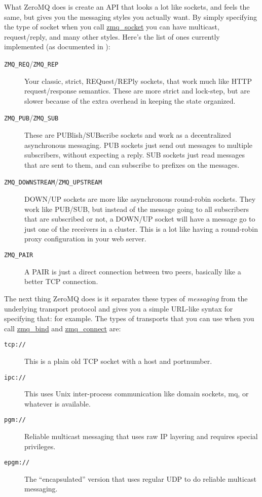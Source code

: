 What ZeroMQ does is create an API that looks a lot like sockets, and feels the
same, but gives you the messaging styles you actually want.  By simply
specifying the type of socket when you call
\href{http://api.zeromq.org/zmq\_socket.html}{zmq\_socket} you can have
multicast, request/reply, and many other styles.  Here's the list of ones
currently implemented (as documented in ):

\begin{description}
  \item [\texttt{ZMQ\_REQ}/\texttt{ZMQ\_REP}]  Your classic, strict, REQuest/REPly sockets, that work much like
    HTTP request/response semantics.  These are more strict and lock-step, but are slower
    because of the extra overhead in keeping the state organized.
  \item [\texttt{ZMQ\_PUB}/\texttt{ZMQ\_SUB}]  These are PUBlish/SUBscribe sockets and work as a decentralized
    asynchronous messaging.  PUB sockets just send out messages to multiple subscribers, without
    expecting a reply.  SUB sockets just read messages that are sent to them, and can subscribe
    to prefixes on the messages.
  \item [\texttt{ZMQ\_DOWNSTREAM}/\texttt{ZMQ\_UPSTREAM}] DOWN/UP sockets are more like asynchronous round-robin
    sockets.  They work like PUB/SUB, but instead of the message going to all subscribers that
    are subscribed or not, a DOWN/UP socket will have a message go to just one of the receivers
    in a cluster.  This is a lot like having a round-robin proxy configuration in your web server.
  \item [\texttt{ZMQ\_PAIR}] A PAIR is just a direct connection between two peers, basically like a better
    TCP connection.
\end{description}

The next thing ZeroMQ does is it separates these types of \emph{messaging} from the underlying
transport protocol and gives you a simple URL-like syntax for specifying that: 
for example.  The types of transports that you can use when you call \href{http://api.zeromq.org/zmq\_bind.html}{zmq\_bind}
and \href{http://api.zeromq.org/zmq\_connect.html}{zmq\_connect} are:

\begin{description}
\item [\texttt{tcp://}] This is a plain old TCP socket with a host and portnumber.
\item [\texttt{ipc://}] This uses Unix inter-process communication like domain sockets, mq, or whatever is available.
\item [\texttt{pgm://}] Reliable multicast messaging that uses raw IP layering and requires special privileges.
\item [\texttt{epgm://}] The ``encapsulated'' version that uses regular UDP to do reliable multicast messaging.
\end{description}

